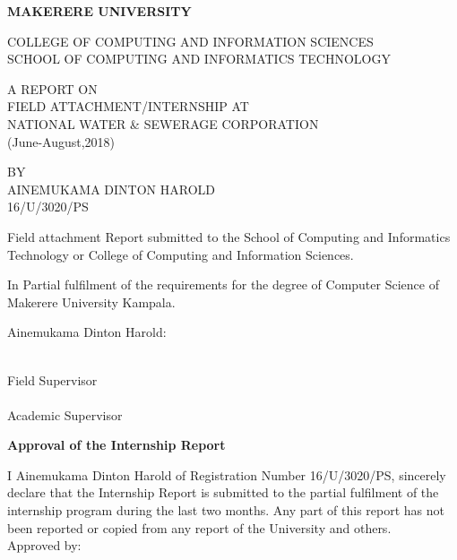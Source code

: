 \documentclass{article}
\begin{document}
\begin{titlepage}
\begin{center}
\textbf{MAKERERE UNIVERSITY}
\end{center}
COLLEGE OF COMPUTING AND INFORMATION SCIENCES\\
SCHOOL OF COMPUTING AND INFORMATICS TECHNOLOGY\\
\begin{center}
A REPORT ON\\FIELD ATTACHMENT/INTERNSHIP AT\\NATIONAL WATER \& SEWERAGE CORPORATION\\(June-August,2018)
\end{center}
\begin{center}
BY\\AINEMUKAMA DINTON HAROLD\\16/U/3020/PS
\end{center}
\hangindent 2cm Field attachment Report submitted to the School of Computing and Informatics Technology or College of Computing and Information Sciences.\\
\par In Partial fulfilment of the requirements for the degree of Computer Science of Makerere University Kampala.
\begin{center}
Ainemukama Dinton Harold:\dotfill
\end{center}
\makebox[2.5in]{\hrulefill} \hspace{0.3in}\makebox[2.5in]{\dotfill}\\
Field Supervisor \hspace{1.5in} \\
\vspace{.1in}
\makebox[2.5in]{\hrulefill} \hspace{0.3in}\makebox[2.5in]{\dotfill}\\
Academic Supervisor  \hspace{1.5in} \\
\end{titlepage}
\newpage
\textbf{Approval of the Internship Report}
\par I Ainemukama Dinton Harold of Registration Number 16/U/3020/PS, sincerely declare that the Internship Report is submitted to the partial fulfilment of the internship program during the last two months. Any part of this report has not been reported or copied from any report of the University and others.\\
Approved by:\\
\end{document}
